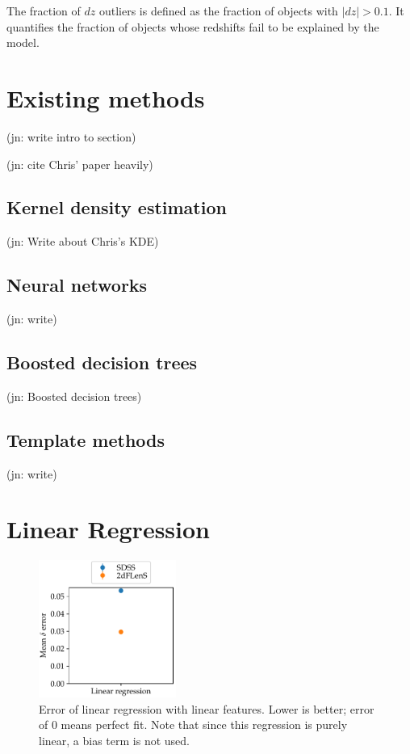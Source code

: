 \documentclass[11pt,twoside]{report}
\newcommand\abs[1]{\left|#1\right|}
\newcommand\jn[1]{{\color{red}(jn: #1)}}
\begin{document}
The fraction of $dz$ outliers is defined as the fraction of objects with $\abs{dz} > 0.1$. It quantifies the fraction of objects whose redshifts fail to be explained by the model.

\section{Existing methods}

\jn{write intro to section}

\jn{cite Chris' paper heavily}

\subsection{Kernel density estimation}

\jn{Write about Chris's KDE}

\subsection{Neural networks}

\jn{write}

\subsection{Boosted decision trees}

\jn{Boosted decision trees}

\subsection{Template methods}

\jn{write}

\section{Linear Regression}

  \begin{figure}
    \centering
    \includegraphics[width=0.4\textwidth]{linreg_plain.pdf}
    \caption{Error of linear regression with linear features. Lower is better; error of $0$ means perfect fit. Note that since this regression is purely linear, a bias term is not used.}
    \label{fig:linreg_plain}
  \end{figure}
\end{document}
